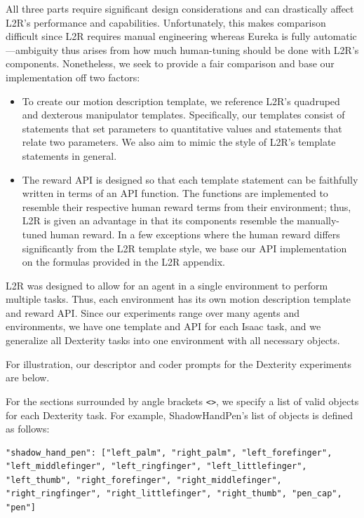 All three parts require significant design considerations and can drastically affect L2R's performance and capabilities. Unfortunately, this makes comparison difficult since L2R requires manual engineering whereas Eureka is fully automatic—ambiguity thus arises from how much human-tuning should be done with L2R's components. Nonetheless, we seek to provide a fair comparison and base our implementation off two factors:
\begin{itemize}[leftmargin=*]
\item To create our motion description template, we reference L2R's quadruped and dexterous manipulator templates. Specifically, our templates consist of statements that set parameters to quantitative values and statements that relate two parameters. We also aim to mimic the style of L2R's template statements in general.
\item The reward API is designed so that each template statement can be faithfully written in terms of an API function. The functions are implemented to resemble their respective human reward terms from their environment; thus, L2R is given an advantage in that its components resemble the manually-tuned human reward. In a few exceptions where the human reward differs significantly from the L2R template style, we base our API implementation on the formulas provided in the L2R appendix.
\end{itemize}

L2R was designed to allow for an agent in a single environment to perform multiple tasks. Thus, each environment has its own motion description template and reward API. Since our experiments range over many agents and environments, we have one template and API for each Isaac task, and we generalize all Dexterity tasks into one environment with all necessary objects.

For illustration, our descriptor and coder prompts for the Dexterity experiments are below.

\renewcommand\lstlistingname{Prompt}
\setcounter{lstlisting}{0}





For the sections surrounded by angle brackets \verb|<>|, we specify a list of valid objects for each Dexterity task. For example, ShadowHandPen's list of objects is defined as follows:
\begin{lstlisting}[basicstyle=\fontfamily{\ttdefault}\scriptsize]
"shadow_hand_pen": ["left_palm", "right_palm", "left_forefinger", "left_middlefinger", "left_ringfinger", "left_littlefinger", "left_thumb", "right_forefinger", "right_middlefinger", "right_ringfinger", "right_littlefinger", "right_thumb", "pen_cap", "pen"]
\end{lstlisting}

